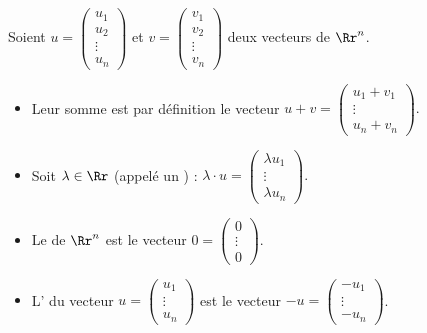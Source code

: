 \documentclass[class=report,crop=false]{standalone}
\begin{document}
\bigskip

 Soient $u = \left(\begin{smallmatrix} u_1\\ u_2\\\vdots \\ u_n \end{smallmatrix}\right)$
  et $v =\left(\begin{smallmatrix} v_1\\ v_2\\\vdots \\ v_n \end{smallmatrix}\right)$ deux vecteurs de $\Rr^n$.

\begin{definition}
\sauteligne
\begin{itemize}
  \item {}
  Leur somme est par définition le vecteur $u + v = \begin{pmatrix}u_1 + v_1 \\ \vdots \\ u_n + v_n\end{pmatrix}.$

  \item {} Soit $\lambda\in \Rr$
  (appelé un ) :
$\lambda \cdot u = \begin{pmatrix}\lambda u_1 \\ \vdots \\ \lambda u_n \end{pmatrix}.$

  \item Le  de $\Rr^n$ est le vecteur
  $0 = \left(\begin{smallmatrix} 0 \\ \vdots \\ 0 \end{smallmatrix}\right)$.

  \item L' du vecteur $u = \left(\begin{smallmatrix} u_1\\ \vdots \\ u_n \end{smallmatrix}\right)$
   est le vecteur $-u = \left(\begin{smallmatrix} -u_1\\ \vdots \\ -u_n \end{smallmatrix}\right)$.
\end{itemize}
\end{definition}
\end{document}
